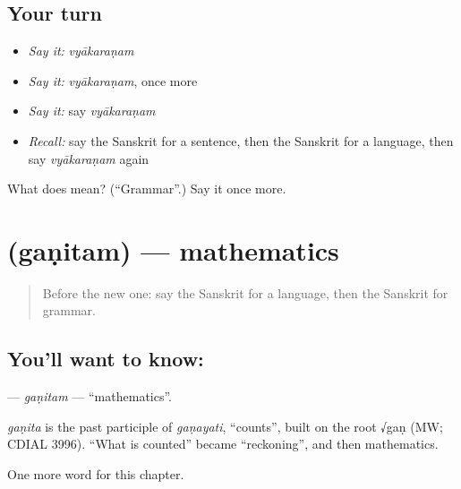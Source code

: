 \subsection*{Your turn}
\begin{itemize}
\raggedright
  \item \emph{Say it:} \emph{vyākaraṇam}
  \item \emph{Say it:} \emph{vyākaraṇam}, once more
  \item \emph{Say it:} say \emph{vyākaraṇam}
  \item \emph{Recall:} say the Sanskrit for a sentence, then the Sanskrit for a language, then say \emph{vyākaraṇam} again
\end{itemize}

\begin{tcolorbox}[breakable,colback=teal!4,colframe=teal!35!black,title={Before you move on}]
What does  mean? (\textquotedblleft{}Grammar\textquotedblright{}.) Say it once more.
\end{tcolorbox}
\section[\texorpdfstring{\sk{गणितम्} (gaṇitam)}{गणितम् (gaṇitam)}]{ (gaṇitam) — mathematics}

\label{lesson:SA-C199-ganitam}



\begin{quote}
Before the new one: say the Sanskrit for a language, then the Sanskrit for grammar.
\end{quote}

\subsection*{You'll want to know: }
\textbf{} — \emph{gaṇitam} — \textquotedblleft{}mathematics\textquotedblright{}.

\begin{cousinweb}
\emph{gaṇita} is the past participle of \emph{gaṇayati}, \textquotedblleft{}counts\textquotedblright{}, built on the root √gaṇ (MW; CDIAL 3996). \textquotedblleft{}What is counted\textquotedblright{} became \textquotedblleft{}reckoning\textquotedblright{}, and then mathematics.
\end{cousinweb}

\begin{grammarlens}[title={What you've built}]
One more word for this chapter.
\end{grammarlens}

